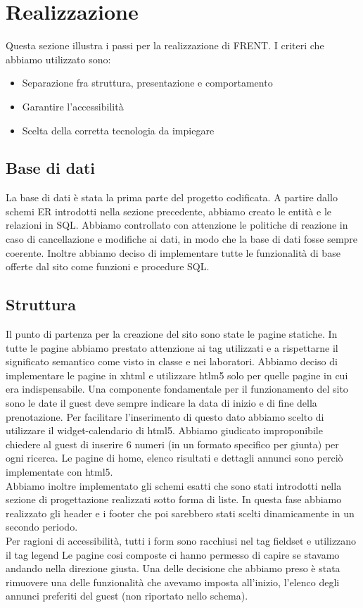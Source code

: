 \documentclass[1_relazione.tex]{subfiles}
\begin{document}
\section{Realizzazione}
Questa sezione illustra i passi per la realizzazione di FRENT.  I criteri che abbiamo utilizzato sono:
\begin{itemize}
\item Separazione fra struttura, presentazione e comportamento 
\item Garantire l'accessibilità
\item Scelta della corretta tecnologia da impiegare
\end{itemize}

\subsection{Base di dati}
La base di dati è stata la prima parte del progetto codificata. A partire dallo schemi ER introdotti nella sezione precedente, abbiamo creato le entità e le relazioni in SQL. Abbiamo controllato con attenzione le politiche di reazione in caso di cancellazione e modifiche ai dati, in modo che la base di dati fosse sempre coerente. Inoltre abbiamo deciso di implementare tutte le funzionalità di base offerte dal sito come funzioni e procedure SQL. 

\subsection{Struttura}
Il punto di partenza per la creazione del sito sono state le pagine statiche. In tutte le pagine abbiamo prestato attenzione ai tag utilizzati e a rispettarne il significato semantico come visto in classe e nei laboratori. Abbiamo deciso di implementare le pagine in xhtml e utilizzare htlm5 solo per quelle pagine in cui era indispensabile. Una componente fondamentale per il funzionamento del sito sono le date il guest deve sempre indicare la data di inizio e di fine della prenotazione. Per facilitare l'inserimento di questo dato abbiamo scelto di utilizzare il widget-calendario di html5. Abbiamo giudicato improponibile chiedere al guest di inserire 6 numeri (in un formato specifico per giunta) per ogni ricerca. Le pagine di home, elenco risultati e dettagli annunci sono perciò implementate con html5. \\
Abbiamo inoltre implementato gli schemi esatti che sono stati introdotti nella sezione di progettazione realizzati sotto forma di liste. In questa fase abbiamo realizzato gli header e i footer che poi sarebbero stati scelti dinamicamente in un secondo periodo. \\
Per ragioni di accessibilità, tutti i form sono racchiusi nel tag fieldset e utilizzano il tag legend  
Le pagine cosi composte ci hanno permesso di capire se stavamo andando nella direzione giusta. Una delle decisione che abbiamo preso è stata rimuovere una delle funzionalità che avevamo imposta all'inizio, l'elenco degli annunci preferiti del guest (non riportato nello schema). 
\end{document}
